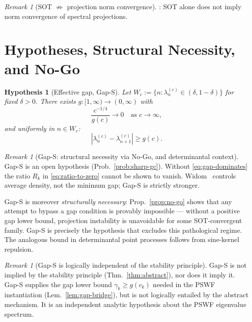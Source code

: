 \documentclass[12pt,a4paper]{amsart}
\newtheorem{hypothesis}[theorem]{Hypothesis}
\theoremstyle{definition}
\theoremstyle{remark}
\newtheorem{remark}[theorem]{Remark}
\begin{document}
\begin{remark}[SOT $\not\Rightarrow$
  projection norm convergence]
\label{rem:strong-vs-norm}
\cite[Ex.~VIII.7.14]{ReedSimon1975}:
SOT alone does not imply norm
convergence of spectral projections.
\end{remark}

\section{Hypotheses, Structural
  Necessity, and No-Go}
\label{sec:gap}

\begin{hypothesis}[Effective gap, Gap-S]
\label{hyp:gap-structural}
Let $W_c:=\{n:\lambda_n^{(c)}
\in(\delta,1-\delta)\}$
for fixed $\delta>0$.
There exists $g\colon[1,\infty)
\to(0,\infty)$ with
\begin{equation}\label{eq:gap-dominates}
  \frac{c^{-1/4}}{g(c)}\to 0
  \quad\text{as }c\to\infty,
\end{equation}
and uniformly in $n\in W_c$:
\begin{equation}\label{eq:gap-s}
  |\lambda_n^{(c)}
  -\lambda_{n+1}^{(c)}|
  \ge g(c).
\end{equation}
\end{hypothesis}

\begin{remark}[Gap-S: structural
  necessity via No-Go, and
  determinantal context]
\label{rem:gap-necessary}
Gap-S is an open hypothesis
(Prob.~\ref{prob:sharp-gc}).
Without \eqref{eq:gap-dominates}
the ratio $R_k$ in
\eqref{eq:ratio-to-zero}
cannot be shown to vanish.
Widom~\cite{Widom1964} controls
average density, not the minimum gap;
Gap-S is strictly stronger.

Gap-S is moreover \emph{structurally
necessary}: Prop.~\ref{prop:no-go}
shows that any attempt to bypass a
gap condition is provably impossible
--- without a positive gap lower bound,
projection instability is unavoidable
for some SOT-convergent family.
Gap-S is precisely the hypothesis that
excludes this pathological regime.
The analogous bound in determinantal
point processes follows from
sine-kernel repulsion.
\end{remark}

\begin{remark}[Gap-S is logically
  independent of the stability principle]
\label{rem:gap-independent}
Gap-S is not implied by the stability
principle (Thm.~\ref{thm:abstract}),
nor does it imply it.
Gap-S supplies the gap lower bound
$\gamma_k\ge g(c_k)$ needed in the
PSWF instantiation
(Lem.~\ref{lem:gap-bridge}),
but is not logically entailed by
the abstract mechanism.
It is an independent analytic
hypothesis about the PSWF eigenvalue
spectrum.
\end{remark}
\end{document}
